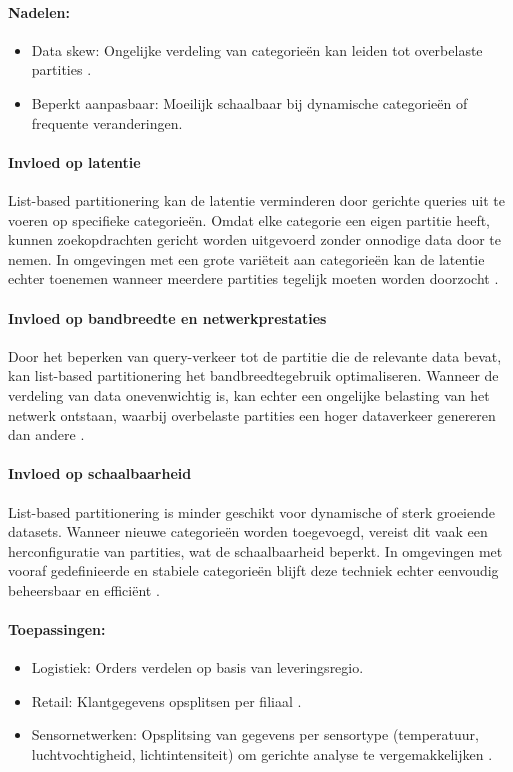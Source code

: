 \paragraph{Nadelen:}
\begin{itemize}
    \item Data skew: Ongelijke verdeling van categorieën kan leiden tot overbelaste partities \autocite{Mahmud2020}.
    \item Beperkt aanpasbaar: Moeilijk schaalbaar bij dynamische categorieën of frequente veranderingen.
\end{itemize}
 
\paragraph{Invloed op latentie} 
List-based partitionering kan de latentie verminderen door gerichte queries uit te voeren op specifieke categorieën. Omdat elke categorie een eigen partitie heeft, kunnen zoekopdrachten gericht worden uitgevoerd zonder onnodige data door te nemen. In omgevingen met een grote variëteit aan categorieën kan de latentie echter toenemen wanneer meerdere partities tegelijk moeten worden doorzocht \autocite{Ponnusamy2024, Mahmud2020}.
 
\paragraph{Invloed op bandbreedte en netwerkprestaties} 
Door het beperken van query-verkeer tot de partitie die de relevante data bevat, kan list-based partitionering het bandbreedtegebruik optimaliseren. Wanneer de verdeling van data onevenwichtig is, kan echter een ongelijke belasting van het netwerk ontstaan, waarbij overbelaste partities een hoger dataverkeer genereren dan andere \autocite{Ponnusamy2024}.
 
\paragraph{Invloed op schaalbaarheid} 
List-based partitionering is minder geschikt voor dynamische of sterk groeiende datasets. Wanneer nieuwe categorieën worden toegevoegd, vereist dit vaak een herconfiguratie van partities, wat de schaalbaarheid beperkt. In omgevingen met vooraf gedefinieerde en stabiele categorieën blijft deze techniek echter eenvoudig beheersbaar en efficiënt \autocite{Mahmud2020}.
 
\paragraph{Toepassingen:}
\begin{itemize}
    \item Logistiek: Orders verdelen op basis van leveringsregio.
    \item Retail: Klantgegevens opsplitsen per filiaal \autocite{Ponnusamy2024}.
    \item Sensornetwerken: Opsplitsing van gegevens per sensortype (temperatuur, luchtvochtigheid, lichtintensiteit) om gerichte analyse te vergemakkelijken \autocite{Mahmud2020}.
\end{itemize}
 
